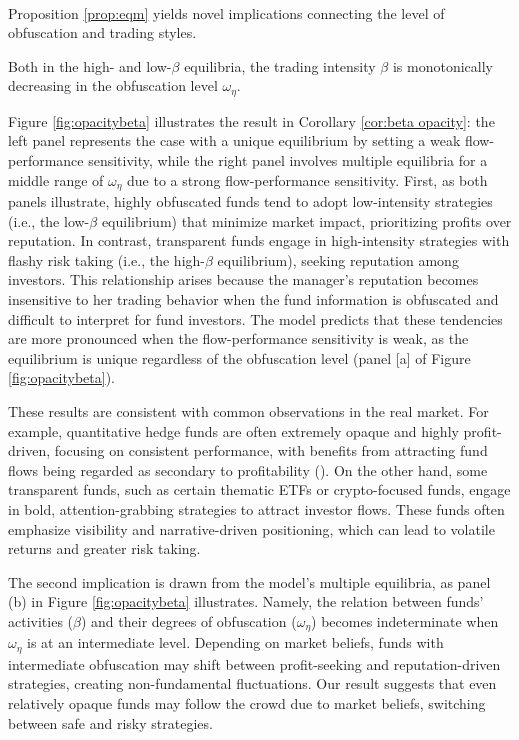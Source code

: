 \paragraph{}
Proposition \ref{prop:eqm} yields novel implications connecting the level of obfuscation and trading styles.
\begin{corollary}\label{cor:beta opacity}
    Both in the high- and low-$\beta$ equilibria, the trading intensity $\beta$ is monotonically decreasing in the obfuscation level $\omega_{\eta}$.
\end{corollary}
Figure \ref{fig:opacitybeta} illustrates the result in Corollary \ref{cor:beta opacity}: the left panel represents the case with a unique equilibrium by setting a weak flow-performance sensitivity, while the right panel involves multiple equilibria for a middle range of $\omega_{\eta}$ due to a strong flow-performance sensitivity.
First, as both panels illustrate, highly obfuscated funds tend to adopt low-intensity strategies (i.e., the low-$\beta$ equilibrium) that minimize market impact, prioritizing profits over reputation. In contrast, transparent funds engage in high-intensity strategies with flashy risk taking (i.e., the high-$\beta$ equilibrium), seeking reputation among investors. This relationship arises because the manager's reputation becomes insensitive to her trading behavior when the fund information is obfuscated and difficult to interpret for fund investors. The model predicts that these tendencies are more pronounced when the flow-performance sensitivity is weak, as the equilibrium is unique regardless of the obfuscation level (panel [a] of Figure \ref{fig:opacitybeta}).



These results are consistent with common observations in the real market. For example, quantitative hedge funds are often extremely opaque and highly profit-driven, focusing on consistent performance, with benefits from attracting fund flows being regarded as secondary to profitability (\citealp{schwager2012hedge}). On the other hand, some transparent funds, such as certain thematic ETFs or crypto-focused funds, engage in bold, attention-grabbing strategies to attract investor flows. These funds often emphasize visibility and narrative-driven positioning, which can lead to volatile returns and greater risk taking.

The second implication is drawn from the model's multiple equilibria, as panel (b) in Figure \ref{fig:opacitybeta} illustrates. Namely, the relation between funds' activities ($\beta$) and their degrees of obfuscation ($\omega_{\eta}$) becomes indeterminate when $\omega_{\eta}$ is at an intermediate level. Depending on market beliefs, funds with intermediate obfuscation may shift between profit-seeking and reputation-driven strategies, creating non-fundamental fluctuations. Our result suggests that even relatively opaque funds may follow the crowd due to market beliefs, switching between safe and risky strategies.

